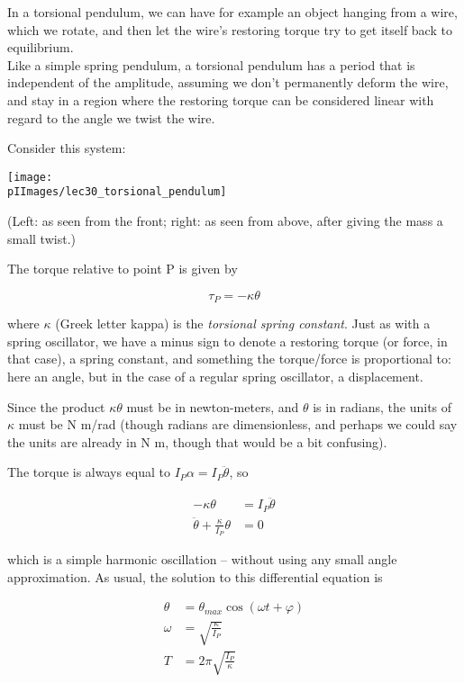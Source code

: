 In a torsional pendulum, we can have for example an object hanging from a wire, which we rotate, and then let the wire's restoring torque try to get itself back to equilibrium.\\
Like a simple spring pendulum, a torsional pendulum has a period that is independent of the amplitude, assuming we don't permanently deform the wire, and stay in a region where the restoring torque can be considered linear with regard to the angle we twist the wire.

Consider this system:

\begin{center}
\texttt{[image: \\pIImages/lec30\_torsional\_pendulum]}
\end{center}

(Left: as seen from the front; right: as seen from above, after giving the mass a small twist.)

The torque relative to point P is given by

\begin{equation}
\tau_P = -\kappa \theta
\end{equation}

where $\kappa$ (Greek letter kappa) is the \emph{torsional spring constant}. Just as with a spring oscillator, we have a minus sign to denote a restoring torque (or force, in that case), a spring constant, and something the torque/force is proportional to: here an angle, but in the case of a regular spring oscillator, a displacement.

Since the product $\kappa \theta$ must be in newton-meters, and $\theta$ is in radians, the units of $\kappa$ must be N m/rad (though radians are dimensionless, and perhaps we could say the units are already in N m, though that would be a bit confusing).

The torque is always equal to $I_P \alpha = I_P \ddot{\theta}$, so 

\begin{align}
- \kappa \theta &= I_P \ddot{\theta}\\
\ddot{\theta} + \frac{\kappa}{I_P} \theta &= 0
\end{align}

which is a simple harmonic oscillation -- without using any small angle approximation. As usual, the solution to this differential equation is

\begin{align}
\theta    &= \theta_{max} \cos(\omega t + \varphi)\\
\omega &= \sqrt{\frac{\kappa}{I_P}}\\
T          &= 2 \pi \sqrt{\frac{I_P}{\kappa}}
\end{align}

